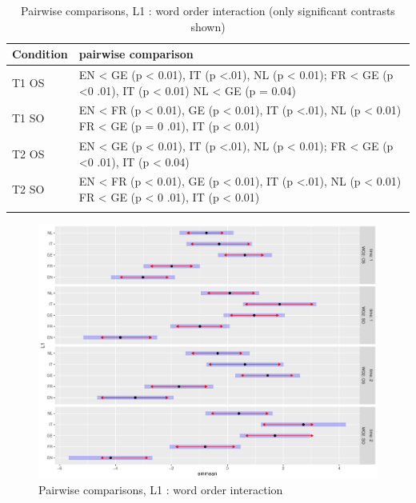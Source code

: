 \begin{table}
    \begin{tabularx}{\textwidth}{lQ}
    \lsptoprule
    Condition & pairwise comparison\\
    \midrule
    T1 OS & EN < GE (p < 0.01), IT (p <.01), NL (p < 0.01);\newline
    FR < GE (p <0 .01), IT (p < 0.01)\newline
    NL < GE (p = 0.04)\\
    \tablevspace
    T1 SO & EN < FR (p < 0.01), GE (p < 0.01), IT (p <.01), NL (p < 0.01)\newline
    FR < GE (p = 0 .01), IT (p < 0.01)\\
    \tablevspace
    T2 OS & EN < GE (p < 0.01), IT (p <.01), NL (p < 0.01);\newline
    FR < GE (p <0 .01), IT (p < 0.04)\\
    \tablevspace
    T2 SO & EN < FR (p < 0.01), GE (p < 0.01), IT (p <.01), NL (p < 0.01)\newline
    FR < GE (p < 0 .01), IT (p < 0.01)\\
    \lspbottomrule
    \end{tabularx}
    \caption{Pairwise comparisons, L1 : word order interaction (only significant contrasts shown)}
    \label{tab:04:5}
\end{table}

\begin{figure}
    \includegraphics[width=\textwidth]{figures/04-3.pdf}
    \caption{Pairwise comparisons, L1 : word order interaction}
    \label{fig:04:3}
\end{figure}

